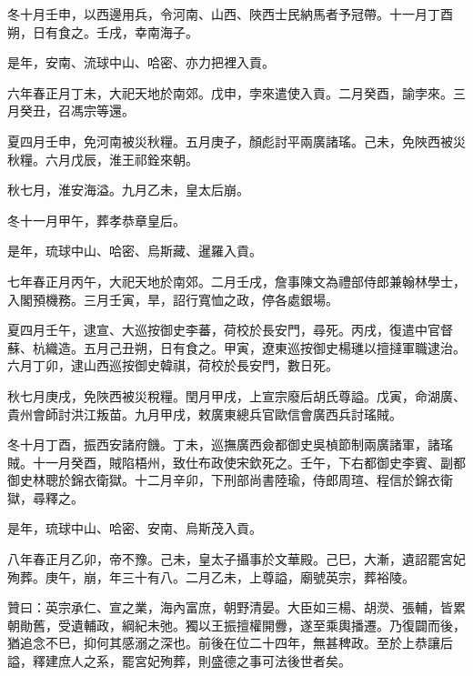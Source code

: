 \begin{pinyinscope}
冬十月壬申，以西邊用兵，令河南、山西、陜西士民納馬者予冠帶。十一月丁酉朔，日有食之。壬戌，幸南海子。

是年，安南、流球中山、哈密、亦力把裡入貢。

六年春正月丁未，大祀天地於南郊。戊申，孛來遣使入貢。二月癸酉，諭孛來。三月癸丑，召馮宗等還。

夏四月壬申，免河南被災秋糧。五月庚子，顏彪討平兩廣諸瑤。己未，免陜西被災秋糧。六月戊辰，淮王祁銓來朝。

秋七月，淮安海溢。九月乙未，皇太后崩。

冬十一月甲午，葬孝恭章皇后。

是年，琉球中山、哈密、烏斯藏、暹羅入貢。

七年春正月丙午，大祀天地於南郊。二月壬戌，詹事陳文為禮部侍郎兼翰林學士，入閣預機務。三月壬寅，旱，詔行寬恤之政，停各處銀場。

夏四月壬午，逮宣、大巡按御史李蕃，荷校於長安門，尋死。丙戌，復遣中官督蘇、杭織造。五月己丑朔，日有食之。甲寅，遼東巡按御史楊璡以擅撻軍職逮治。六月丁卯，逮山西巡按御史韓祺，荷校於長安門，數日死。

秋七月庚戌，免陜西被災稅糧。閏月甲戌，上宣宗廢后胡氏尊謚。戊寅，命湖廣、貴州會師討洪江叛苗。九月甲戌，敕廣東總兵官歐信會廣西兵討瑤賊。

冬十月丁酉，振西安諸府饑。丁未，巡撫廣西僉都御史吳楨節制兩廣諸軍，諸瑤賊。十一月癸酉，賊陷梧州，致仕布政使宋欽死之。壬午，下右都御史李賓、副都御史林聰於錦衣衛獄。十二月辛卯，下刑部尚書陸瑜，侍郎周瑄、程信於錦衣衛獄，尋釋之。

是年，琉球中山、哈密、安南、烏斯茂入貢。

八年春正月乙卯，帝不豫。己未，皇太子攝事於文華殿。己巳，大漸，遺詔罷宮妃殉葬。庚午，崩，年三十有八。二月乙未，上尊謚，廟號英宗，葬裕陵。

贊曰：英宗承仁、宣之業，海內富庶，朝野清晏。大臣如三楊、胡濙、張輔，皆累朝勛舊，受遺輔政，綱紀未弛。獨以王振擅權開釁，遂至乘輿播遷。乃復闢而後，猶追念不巳，抑何其感溺之深也。前後在位二十四年，無甚稗政。至於上恭讓后謚，釋建庶人之系，罷宮妃殉葬，則盛德之事可法後世者矣。


\end{pinyinscope}